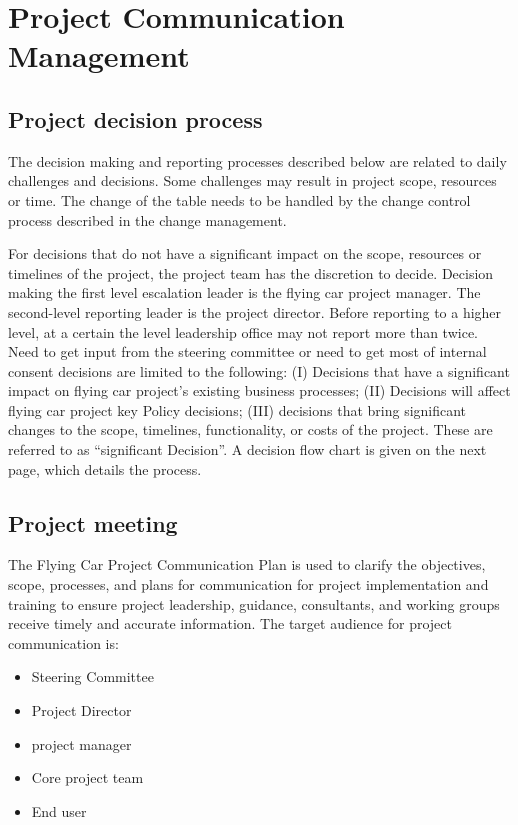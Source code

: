 \chapter{Project Communication Management}

\section{Project decision process}

The decision making and reporting processes described below are related to daily challenges and decisions. Some challenges may result in project scope, resources or time. The change of the table needs to be handled by the change control process described in the change management. 

For decisions that do not have a significant impact on the scope, resources or timelines of the project, the project team has the discretion to decide. Decision making the first level escalation leader is the flying car project manager. The second-level reporting leader is the project director. Before reporting to a higher level, at a certain the level leadership office may not report more than twice. Need to get input from the steering committee or need to get most of internal consent decisions are limited to the following: (I) Decisions that have a significant impact on flying car project's existing business processes; (II) Decisions will affect flying car project key Policy decisions; (III) decisions that bring significant changes to the scope, timelines, functionality, or costs of the project. These are referred to as “significant Decision”. A decision flow chart is given on the next page, which details the process. 

{\color{red}{流程图}}

\section{Project meeting}

The Flying Car Project Communication Plan is used to clarify the objectives, scope, processes, and plans for communication for project implementation and training to ensure project leadership, guidance, consultants, and working groups receive timely and accurate information. The target audience for project communication is:

\begin{itemize}
\item Steering Committee
\item Project Director
\item project manager
\item Core project team
\item End user
\end{itemize}

